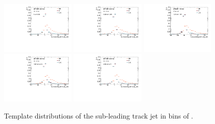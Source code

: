 \begin{figure}[htbp]
  \centering
 \includegraphics[width=0.32\textwidth]{figures/gbb/Sub_Sd0_Fits/Canv_FitTemplate_0-Deltaphi-0628_LpT_INF_SpT_INF_y.pdf}
 \includegraphics[width=0.32\textwidth]{figures/gbb/Sub_Sd0_Fits/Canv_FitTemplate_0628-Deltaphi-1256_LpT_INF_SpT_INF_y.pdf}
 \includegraphics[width=0.32\textwidth]{figures/gbb/Sub_Sd0_Fits/Canv_FitTemplate_1256-Deltaphi-1884_LpT_INF_SpT_INF_y.pdf}\\
 \includegraphics[width=0.32\textwidth]{figures/gbb/Sub_Sd0_Fits/Canv_FitTemplate_1884-Deltaphi-2512_LpT_INF_SpT_INF_y.pdf}
 \includegraphics[width=0.32\textwidth]{figures/gbb/Sub_Sd0_Fits/Canv_FitTemplate_2512-Deltaphi-3140_LpT_INF_SpT_INF_y.pdf}

\caption{Template \subsdzero distributions of the sub-leading track jet in bins of \dphi. }
  \label{fig:dphi-template-subleading}
\end{figure}

\clearpage
